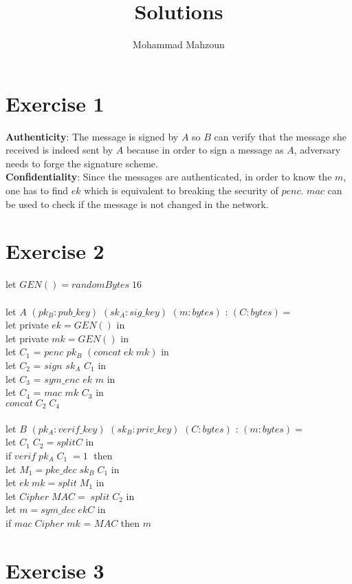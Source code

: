 \documentclass{article}
\title{Solutions} %
\author{Mohammad Mahzoun} %
\begin{document}
\maketitle %


\section{Exercise 1}
\textbf{Authenticity}: The message is signed by $A$ so $B$ can verify that the message she received is indeed sent by $A$ because in order to sign a message as $A$, adversary needs to forge the signature scheme.   \\  
\textbf{Confidentiality}: Since the messages are authenticated, in order to know the $m$, one has to find $ek$ which is equivalent to breaking the security of $penc$. $mac$ can be used to check if the message is not changed in the network.

\section{Exercise 2}
let $GEN()   = randomBytes \;16$ \\ \\
let $A$ $(pk_B: pub\_key)$ $(sk_A: sig\_key)$ $(m: bytes)$ : $(C: bytes) =$ \\
let private $ek = GEN()$ in \\
let private $mk = GEN()$ in \\
let $C_1$ = $penc$ $pk_B$ $(concat\;ek\;mk)$ in \\
let $C_2$ = $sign$ $sk_A$ $C_1$ in \\
let $C_3$ = $sym\_enc$ $ek$ $m$ in \\
let $C_4$ = $mac$ $mk$ $C_3$ in \\
$concat\; C_2 \; C_4$
\\
\\
let $B$ $(pk_A: verif\_key)$ $(sk_B: priv\_key)$ $(C: bytes)$ : $(m: bytes) =$ \\
let $C_1\; C_2 = split C$ in \\
if $verif\; pk_A\; C_1 \; = 1 \;$ then \\
let $M_1 = pke\_dec \; sk_B \; C_1$ in \\
let $ek\; mk = split \; M_1$ in \\
let $Cipher\; MAC = \; split \; C_2$ in \\ 
let $m = sym\_dec \; ek C$ in \\
if $mac\; Cipher \; mk$ = $MAC$ then $m$ 

\section{Exercise 3}
\end{document}

